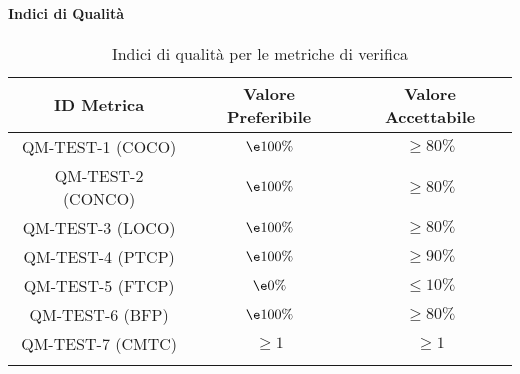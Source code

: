 		\paragraph{Indici di Qualità}

			\begin{center}
				\begin{longtable}{|c|c|c|}
				\hline
				\rowcolor{lighter-grayer}
				\textbf{ID Metrica} & \textbf{Valore Preferibile} & \textbf{Valore Accettabile}\\
				\hline
				\endfirsthead
				\hline
				QM-TEST-1 (COCO) & \(\e 100\%\) & \(\geq 80\%\) \\ \hline
				QM-TEST-2 (CONCO) & \(\e 100\%\) & \(\geq 80\%\) \\ \hline
				QM-TEST-3 (LOCO) & \(\e 100\%\) & \(\geq 80\%\) \\ \hline
				QM-TEST-4 (PTCP) & \(\e 100\%\) & \(\geq 90\%\) \\ \hline
				QM-TEST-5 (FTCP) & \(\e 0\%\) & \(\le 10\%\) \\ \hline
				QM-TEST-6 (BFP) & \(\e 100\%\) & \(\geq 80\%\) \\ \hline
				QM-TEST-7 (CMTC) & \(\geq 1\) & \(\geq 1\) \\ \hline
				\hline
				\caption{Indici di qualità per le metriche di verifica}
				\end{longtable}
			\end{center}
